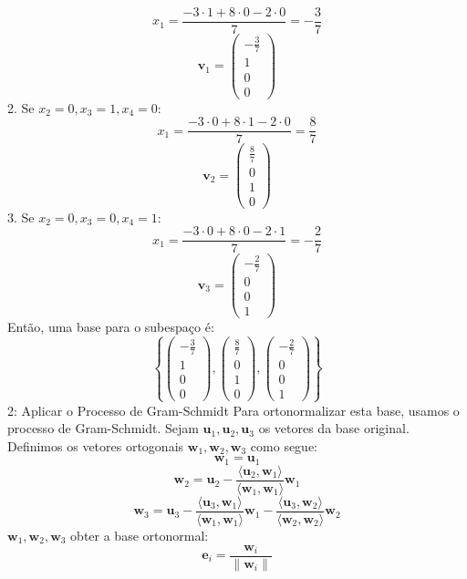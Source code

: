 {{{\[
x_1 = \frac{-3 \cdot 1 + 8 \cdot 0 - 2 \cdot 0}{7} = -\frac{3}{7}
\]
\[
\mathbf{v}_1 = \begin{pmatrix}
-\frac{3}{7} \\
1 \\
0 \\
0
\end{pmatrix}
\]
2. Se \(x_2 = 0, x_3 = 1, x_4 = 0\):
\[
x_1 = \frac{-3 \cdot 0 + 8 \cdot 1 - 2 \cdot 0}{7} = \frac{8}{7}
\]
\[
\mathbf{v}_2 = \begin{pmatrix}
\frac{8}{7} \\
0 \\
1 \\
0
\end{pmatrix}
\]
3. Se \(x_2 = 0, x_3 = 0, x_4 = 1\):
\[
x_1 = \frac{-3 \cdot 0 + 8 \cdot 0 - 2 \cdot 1}{7} = -\frac{2}{7}
\]
\[
\mathbf{v}_3 = \begin{pmatrix}
-\frac{2}{7} \\
0 \\
0 \\
1
\end{pmatrix}
\]
Então, uma base para o subespaço é:
\[
\left\{ \begin{pmatrix}
-\frac{3}{7} \\
1 \\
0 \\
0
\end{pmatrix},
\begin{pmatrix}
\frac{8}{7} \\
0 \\
1 \\
0
\end{pmatrix},
\begin{pmatrix}
-\frac{2}{7} \\
0 \\
0 \\
1
\end{pmatrix} \right\}
\]
2: Aplicar o Processo de Gram-Schmidt
Para ortonormalizar esta base, usamos o processo de Gram-Schmidt.
Sejam \(\mathbf{u}_1, \mathbf{u}_2, \mathbf{u}_3\) os vetores da base original. Definimos os vetores ortogonais \(\mathbf{w}_1, \mathbf{w}_2, \mathbf{w}_3\) como segue:
\[
\mathbf{w}_1 = \mathbf{u}_1
\]
\[
\mathbf{w}_2 = \mathbf{u}_2 - \frac{\langle \mathbf{u}_2, \mathbf{w}_1 \rangle}{\langle \mathbf{w}_1, \mathbf{w}_1 \rangle} \mathbf{w}_1
\]
\[
\mathbf{w}_3 = \mathbf{u}_3 - \frac{\langle \mathbf{u}_3, \mathbf{w}_1 \rangle}{\langle \mathbf{w}_1, \mathbf{w}_1 \rangle} \mathbf{w}_1 - \frac{\langle \mathbf{u}_3, \mathbf{w}_2 \rangle}{\langle \mathbf{w}_2, \mathbf{w}_2 \rangle} \mathbf{w}_2
\]
 \(\mathbf{w}_1, \mathbf{w}_2, \mathbf{w}_3\) obter a base ortonormal:
\[
\mathbf{e}_i = \frac{\mathbf{w}_i}{\|\mathbf{w}_i\|}
\]

}}}
